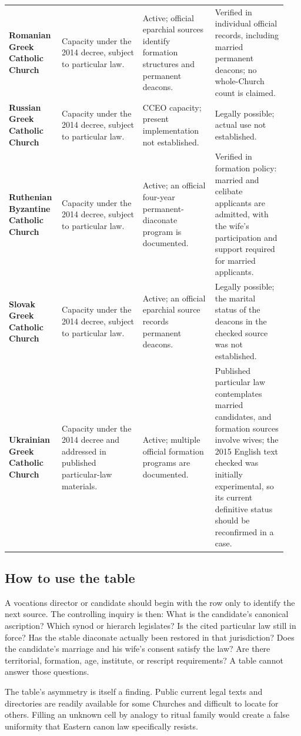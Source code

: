 \begin{landscape}
\begin{longtable}{>{\bfseries\RaggedRight\arraybackslash}p{0.15\linewidth}>{\RaggedRight\arraybackslash}p{0.29\linewidth}>{\RaggedRight\arraybackslash}p{0.25\linewidth}>{\RaggedRight\arraybackslash}p{0.25\linewidth}}
Romanian Greek Catholic Church & Capacity under the 2014 decree, subject to particular law. & Active; official eparchial sources identify formation structures and permanent deacons. & Verified in individual official records, including married permanent deacons; no whole-Church count is claimed.\\
Russian Greek Catholic Church & Capacity under the 2014 decree, subject to particular law. & CCEO capacity; present implementation not established. & Legally possible; actual use not established.\\
Ruthenian Byzantine Catholic Church & Capacity under the 2014 decree, subject to particular law. & Active; an official four-year permanent-diaconate program is documented. & Verified in formation policy: married and celibate applicants are admitted, with the wife's participation and support required for married applicants.\\
Slovak Greek Catholic Church & Capacity under the 2014 decree, subject to particular law. & Active; an official eparchial source records permanent deacons. & Legally possible; the marital status of the deacons in the checked source was not established.\\
Ukrainian Greek Catholic Church & Capacity under the 2014 decree and addressed in published particular-law materials. & Active; multiple official formation programs are documented. & Published particular law contemplates married candidates, and formation sources involve wives; the 2015 English text checked was initially experimental, so its current definitive status should be reconfirmed in a case.\\

\end{longtable}
\endgroup
\end{landscape}

\subsection{How to use the table}

A vocations director or candidate should begin with the row only to identify the next source. The controlling inquiry is then: What is the candidate's canonical ascription? Which synod or hierarch legislates? Is the cited particular law still in force? Has the stable diaconate actually been restored in that jurisdiction? Does the candidate's marriage and his wife's consent satisfy the law? Are there territorial, formation, age, institute, or rescript requirements? A table cannot answer those questions.

The table's asymmetry is itself a finding. Public current legal texts and directories are readily available for some Churches and difficult to locate for others. Filling an unknown cell by analogy to ritual family would create a false uniformity that Eastern canon law specifically resists.
